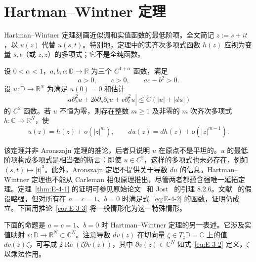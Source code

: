 
\section{Hartman--Wintner 定理}\label{sec:E-4}

Hartman--Wintner 定理刻画近似调和实值函数的最低阶项。全文简记 $z:=s+it$，以 $u(z)$ 代替 $u(s,t)$。特别地，定理中的实齐次多项式函数 $h(z)$ 应视为变量 $s,t$（或 $z,\bar z$）的多项式；它不是全纯函数。

\begin{theorem}\label{thm:E-4-1}
设 $0<\alpha<1$，$a,b,c:\mathbb D\to\mathbb R$ 为三个 $C^{1+\alpha}$ 函数，满足
\begin{equation}\label{eq:E-4-1}
  a>0,\qquad c>0,\qquad ac-b^2>0.
\end{equation}
设 $u:\mathbb D\to\mathbb R^N$ 为满足 $u(0)=0$ 和估计
\begin{equation}\label{eq:E-4-2}
  |a\partial_s^2u+2b\partial_s\partial_tu+c\partial_t^2u|
  \le C(|u|+|du|)
\end{equation}
的 $C^2$ 函数。若 $u$ 不恒为零，则存在整数 $m\ge1$ 及非零的 $m$ 次齐次多项式 $h:\mathbb C\to\mathbb R^N$，使
\[
  u(z)=h(z)+o(|z|^m),\qquad
  du(z)=dh(z)+o(|z|^{m-1}).
\]
\end{theorem}

\begin{remark}\label{rem:E-4-2}
该定理并非 Aronszajn 定理的推论，后者只说明 $u$ 在原点不是平坦的。$u$ 的最低阶项构成多项式是相当强的断言：即使 $u\in C^2$，这样的多项式也未必存在，例如 $(s,t)\mapsto|t|^3$。此外，Aronszajn 定理不提供关于导数 $du$ 的信息。Hartman--Wintner 定理也不能从 Carleman 相似原理推出，尽管两者都蕴含强唯一延拓定理。定理~\ref{thm:E-4-1} 的证明可参见原始论文~ 和 Jost~ 的引理 8.2.6。文献~ 的假设略强，但对所有在 $a=c=1$、$b=0$ 时满足式~\eqref{eq:E-4-2} 的函数，证明仍成立。下面用推论~\ref{cor:E-3-3} 将一般情形化为这一特殊情形。
\end{remark}

下面的命题是 $a=c=1$、$b=0$ 时 Hartman--Wintner 定理的另一表述。它涉及实值映射 $v:\mathbb D\to\mathbb R^N\subset\mathbb C^N$。注意导数 $dv(z)$ 在切向量 $\zeta\in T_z\mathbb D=\mathbb C$ 上的值 $dv(z)\zeta$，可写成 $2\operatorname{Re}(\zeta\partial v(z))$，其中 $\partial v(z)\in\mathbb C^N$ 如式~\eqref{eq:E-3-2} 定义，$\zeta$ 以乘法作用。

